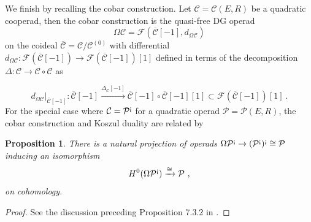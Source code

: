 \documentclass[11pt]{amsart}
\numberwithin{equation}{section}
\newtheorem{prop}[theo]{Proposition}
\theoremstyle{definition}
\newtheorem{eg}[theo]{Example}
\newcommand{\mc}{\mathcal}
\newcommand{\Pois}{{\textup{Pois}}}
\newcommand{\Comm}{{\textup{Comm}}}
\newcommand{\Lie}{{\textup{Lie}}}
\newcommand{\ash}{{\textup{\mbox{!`}}}}
\newcommand{\Ass}{{\textup{Ass}}}
\newcommand{\CC}{{\textup{CC}}}
\newcommand{\0}{{\textbf{0}}}
\def\CC{{\mc C}}
\def\FF{{\mc F}}
\def\PP{{\mc P}}
\begin{document}
%
%
%
%

We finish by recalling the cobar construction. Let $\CC=\CC(E,R)$ be a quadratic cooperad, then the cobar construction is the quasi-free DG operad
\[
\Omega\CC = \FF(\overline{\CC}[-1],d_{\Omega \CC})
\]
on the coideal $\overline{\CC} = \CC/\CC^{(0)}$ with differential $d_{\Omega\mc C}:\mc F( \overline{\mc C}[-1])\to \mc F( \overline{\mc C}[-1])[1]$ defined in terms of the decomposition $\Delta: \CC\rightarrow \CC\circ \CC$ as 

\[
d_{\Omega\mc C}|_{\overline{\mc C}[-1]} : \overline{\mc C}[-1] \xrightarrow{\Delta_{\mc C}[-1]}  \overline{\mc C}[-1] \circ \overline{\mc C}[-1] [1] \subset \mc F( \overline{\mc C}[-1])[1]  \ . 
\]
For the special case where $\CC = \PP^\ash$ for a quadratic operad $\PP=\PP(E,R)$, the cobar construction and Koszul duality are related by
\begin{prop} 
There is a natural projection of operads $\Omega\PP^\ash\rightarrow (\PP^\ash)^\ash\cong\PP$ inducing an isomorphism
\[ 
 H^0(\Omega \mc P^\ash ) \xrightarrow{ \cong} \mc P ~,
\]
on cohomology.
\end{prop}
\begin{proof}
See the discussion preceding Proposition 7.3.2 in \cite{LV}.
\end{proof}
\end{document}
